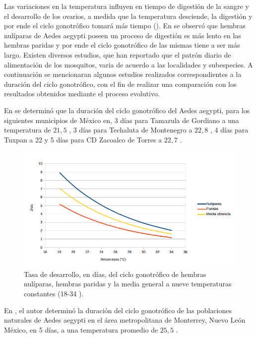 Las variaciones en la temperatura influyen en tiempo de digestión de la sangre y el
desarrollo de los ovarios, a medida que la temperatura desciende, la digestión y por ende el ciclo
gonotrófico tomará más tiempo (). En \cite{edman1987host}
se observó que hembras nulíparas de Aedes aegypti poseen un proceso de digestión es más lento en
las hembras paridas y por ende el ciclo gonotrófico de las mismas tiene a ser más largo. Existen
diversos estudios, que han reportado que el patrón diario de alimentación de los mosquitos, varia
de acuerdo a las localidades y subespecies. A continuación se mencionaran algunos estudios
realizados correspondientes a la duración del ciclo gonotrófico, con el fin de realizar una
comparación con los resultados obtenidos mediante el proceso evolutivo.


En \cite{beltran2001bionomia} se determinó que la duración del ciclo gonotrófico del Aedes
aegypti, para los siguientes municipios de México en, 3 días para Tamazula de Gordiano a una
temperatura de $21,5$ \textcelsius, 3 días para Techaluta de Montenegro a $22,8$ \textcelsius, 4
días para Tuxpan a 22 \textcelsius y 5 días para CD Zacoalco de Torres a $22,7$ \textcelsius.

\begin{figure}[!htbp]
    \centering
    \includegraphics[width=1\textwidth]{capitulo-6/graphics/ciclo-gonotrofico-temperatura.png}
    \caption{\label{fig:ciclo-gonotrofico-temperatura} Tasa de desarrollo, en días, del ciclo
    gonotrófico de hembras nulíparas, hembras paridas y la media general a nueve temperaturas
    constantes (18-34 \textcelsius).}
\end{figure}

En \cite{luevano1993ciclo}, el autor determinó la duración del ciclo gonotrófico de las
poblaciones naturales de Aedes aegypti en el área metropolitana de Monterrey, Nuevo León México,
en 5 días, a una temperatura promedio de $25,5$ \textcelsius.

